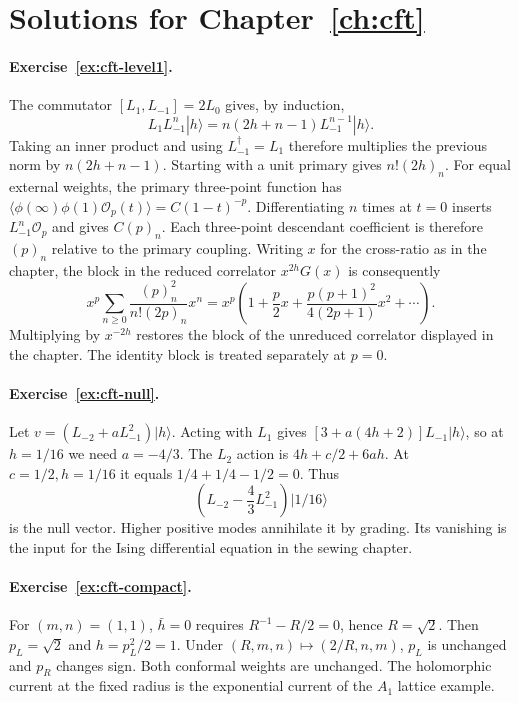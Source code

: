 \section{Solutions for Chapter~\ref{ch:cft}}

\paragraph{Exercise~\ref{ex:cft-level1}.}
\label{sol:ex:cft-level1}
The commutator $[L_1,L_{-1}]=2L_0$ gives, by induction,
\[
 L_1L_{-1}^n|h\rangle
 =n(2h+n-1)L_{-1}^{n-1}|h\rangle.
\]
Taking an inner product and using $L_{-1}^\dagger=L_1$
therefore multiplies the previous norm by $n(2h+n-1)$.
Starting with a unit primary gives $n!(2h)_n$.
For equal external weights, the primary three-point function has
$\langle\phi(\infty)\phi(1)\mathcal O_p(t)\rangle
=C(1-t)^{-p}$. Differentiating $n$ times at $t=0$ inserts
$L_{-1}^n\mathcal O_p$ and gives $C(p)_n$.
Each three-point descendant coefficient is therefore $(p)_n$
relative to the primary coupling.
Writing $x$ for the cross-ratio as in the chapter, the block in the
reduced correlator $x^{2h}G(x)$ is consequently
\[
 x^p\sum_{n\ge0}\frac{(p)_n^2}{n!(2p)_n}x^n
 =x^p\left(1+\frac p2x+
       \frac{p(p+1)^2}{4(2p+1)}x^2+\cdots\right).
\]
Multiplying by $x^{-2h}$ restores the block of the unreduced
correlator displayed in the chapter.
The identity block is treated separately at $p=0$.



\paragraph{Exercise~\ref{ex:cft-null}.}
\label{sol:ex:cft-null}
Let $v=(L_{-2}+aL_{-1}^2)|h\rangle$. Acting with $L_1$
gives $[3+a(4h+2)]L_{-1}|h\rangle$, so at $h=1/16$
we need $a=-4/3$. The $L_2$ action is
$4h+c/2+6ah$. At $c=1/2,h=1/16$ it equals
$1/4+1/4-1/2=0$. Thus
\[
 \left(L_{-2}-\frac43L_{-1}^2\right)|1/16\rangle
\]
is the null vector. Higher positive modes annihilate it by
grading. Its vanishing is the input for the Ising differential
equation in the sewing chapter.



\paragraph{Exercise~\ref{ex:cft-compact}.}
\label{sol:ex:cft-compact}
For $(m,n)=(1,1)$, $\bar h=0$ requires $R^{-1}-R/2=0$,
hence $R=\sqrt2$. Then $p_L=\sqrt2$ and $h=p_L^2/2=1$.
Under $(R,m,n)\mapsto(2/R,n,m)$, $p_L$ is unchanged
and $p_R$ changes sign. Both conformal weights are unchanged.
The holomorphic current at the fixed radius is the exponential
current of the $A_1$ lattice example.



